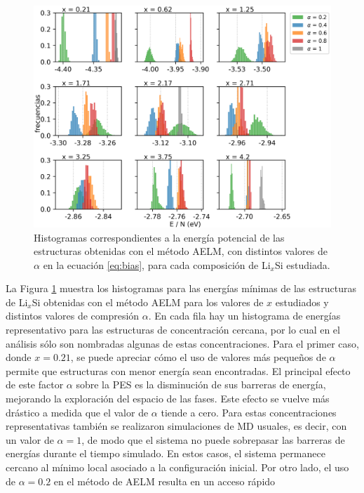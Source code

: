 \begin{figure}[t]
    \centering
    \includegraphics[width=\textwidth]{Silicio/caracterizacion/resultados/introduccion/energias.png}
    \caption{Histogramas correspondientes a la energía potencial de las 
    estructuras obtenidas con el método AELM, con distintos valores de $\alpha$
    en la ecuación \ref{eq:bias}, para cada composición de Li$_x$Si estudiada.}
    \label{fig:energias}
\end{figure}
La Figura \ref{fig:energias} muestra los histogramas para las energías mínimas
de las estructuras de Li$_x$Si obtenidas con el método AELM para los valores de
$x$ estudiados y distintos valores de compresión $\alpha$. En cada fila hay un 
histograma de energías representativo para las estructuras de concentración 
cercana, por lo cual en el análisis sólo son nombradas algunas de estas 
concentraciones. Para el primer caso, donde $x = 0.21$, se puede apreciar cómo el 
uso de valores más pequeños de $\alpha$ permite que estructuras con menor energía 
sean encontradas. El principal efecto de este factor $\alpha$ sobre la PES es la 
disminución de sus barreras de energía, mejorando la exploración del espacio de 
las fases. Este efecto se vuelve más drástico a medida que el valor de $\alpha$ 
tiende a cero. Para estas concentraciones representativas también se realizaron 
simulaciones de MD usuales, es decir, con un valor de $\alpha = 1$, de modo que el sistema no 
puede sobrepasar las barreras de energías durante el tiempo simulado. En estos casos, el sistema 
permanece cercano al mínimo local asociado a la configuración inicial. Por otro 
lado, el uso de $\alpha = 0.2$ en el método de AELM resulta en un acceso rápido
